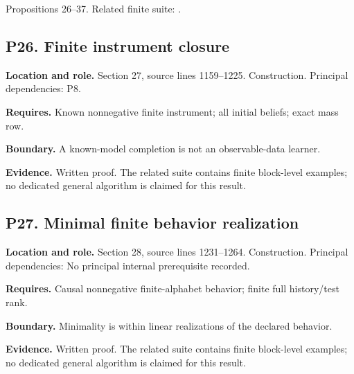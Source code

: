 \documentclass[11pt,letterpaper]{article}
\begin{document}
Propositions 26--37. Related finite suite:
.

\par\noindent\begin{minipage}{\textwidth}
\subsection{P26. Finite instrument
closure}\label{p26.-finite-instrument-closure}

\textbf{Location and role.} Section 27, source lines 1159--1225.
Construction. Principal dependencies: P8.

\textbf{Requires.} Known nonnegative finite instrument; all initial
beliefs; exact mass row.

\textbf{Boundary.} A known-model completion is not an observable-data
learner.

\textbf{Evidence.} Written proof. The related suite contains finite
block-level examples; no dedicated general algorithm is claimed for this
result.
\end{minipage}\par\medskip

\par\noindent\begin{minipage}{\textwidth}
\subsection{P27. Minimal finite behavior
realization}\label{p27.-minimal-finite-behavior-realization}

\textbf{Location and role.} Section 28, source lines 1231--1264.
Construction. Principal dependencies: No principal internal prerequisite
recorded.

\textbf{Requires.} Causal nonnegative finite-alphabet behavior; finite
full history/test rank.

\textbf{Boundary.} Minimality is within linear realizations of the
declared behavior.

\textbf{Evidence.} Written proof. The related suite contains finite
block-level examples; no dedicated general algorithm is claimed for this
result.
\end{minipage}\par\medskip
\end{document}
